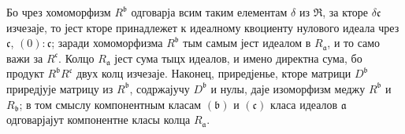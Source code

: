 \documentclass[11pt]{article}
\begin{document}
Бо чрез хомоморфизм $R^{\mathfrak b}$ одговарја всим таким елементам $\delta$ из $\mathfrak R$, за кторе $\delta\mathfrak c$ изчезаје, то јест кторе принадлежет к идеалному квоциенту нулового идеала чрез $\mathfrak c$, $(0):\mathfrak c$; заради хомоморфизма $R^{\mathfrak b}$ тым самым јест идеалом в $R_{\mathfrak a}$, и то само важи за $R^{\mathfrak c}$. Колцо $R_{\mathfrak a}$ јест сума тыцх идеалов, и имено директна сума, бо продукт $R^{\mathfrak b}R^{\mathfrak c}$ двух колц изчезаје. Наконец, приредјенье, кторе матрици $D^{\mathfrak b}$ приредјује матрицу из $R^{\mathfrak b}$, содржајучу $D^{\mathfrak b}$ и нулы, даје изоморфизм меджу $R^{\mathfrak b}$ и $R_{\mathfrak b}$; в том смыслу компонентным класам $(\mathfrak b)$ и $(\mathfrak c)$ класа идеалов $\mathfrak a$ одговарјајут компонентне класы колца $R_{\mathfrak a}$.
\end{document}
